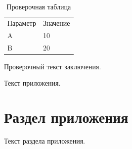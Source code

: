 \documentclass{bmstu-sob}
\begin{document}
\begin{table}[htbp]
  \caption{Проверочная таблица}
  \label{tab:test}
  \centering
  \begin{tabular}{ll}
    Параметр & Значение \\
    A & 10 \\
    B & 20 \\
  \end{tabular}
\end{table}

\bmstuConclusion

Проверочный текст заключения.

\bmstuReferencesTitle

\begin{bmstubibliography}
\end{bmstubibliography}

\appendix
{}

Текст приложения.

\section{Раздел приложения}
Текст раздела приложения.
\end{document}
